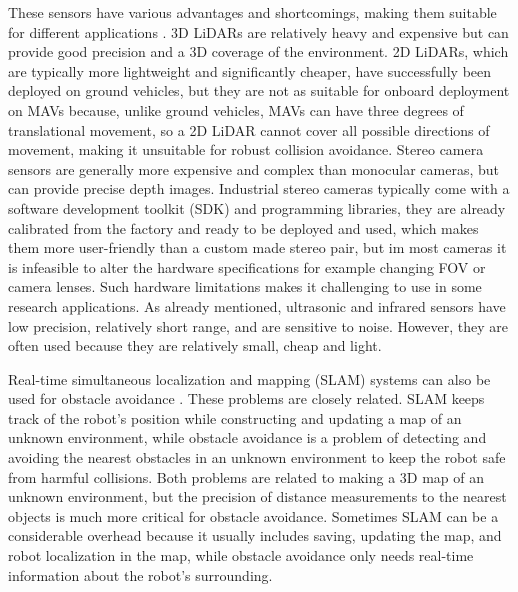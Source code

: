 These sensors have various advantages and shortcomings, making them suitable for different applications \cite{Huang2019,Aguilar2017}.
3D LiDARs are relatively heavy and expensive but can provide good precision and a 3D coverage of the environment.
2D LiDARs, which are typically more lightweight and significantly cheaper, have successfully been deployed on ground vehicles, but they are not as suitable for onboard deployment on MAVs because, unlike ground vehicles, MAVs can have three degrees of translational movement, so a 2D LiDAR cannot cover all possible directions of movement, making it unsuitable for robust collision avoidance.
Stereo camera sensors are generally more expensive and complex than monocular cameras, but can provide precise depth images. 
Industrial stereo cameras typically come with a software development toolkit (SDK) and programming libraries, they are already calibrated from the factory and ready to be deployed and used, which makes them more user-friendly than a custom made stereo pair, but im most cameras it is infeasible to alter the hardware specifications for example changing FOV or camera lenses.
Such hardware limitations makes it challenging to use in some research applications.
As already mentioned, ultrasonic and infrared sensors have low precision, relatively short range, and are sensitive to noise.
However, they are often used because they are relatively small, cheap and light.

Real-time simultaneous localization and mapping (SLAM) systems can also be used for obstacle avoidance \cite{Moreno2014}. 
These problems are closely related. 
SLAM keeps track of the robot's position while constructing and updating a map of an unknown environment, while obstacle avoidance is a problem of detecting and avoiding the nearest obstacles in an unknown environment to keep the robot safe from harmful collisions.
Both problems are related to making a 3D map of an unknown environment, but the precision of distance measurements to the nearest objects is much more critical for obstacle avoidance.
Sometimes SLAM can be a considerable overhead because it usually includes saving, updating the map, and robot localization in the map, while obstacle avoidance only needs real-time information about the robot's surrounding.

